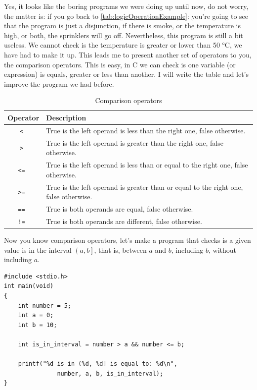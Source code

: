 \documentclass[a4paper]{article}
\newcommand{\centigrade}{°C}
\begin{document}
Yes, it looks like the boring programs we were doing up until now, do not worry,
the matter is: if you go back to \ref{tab:logicOperationExample}:
 you're going to see that the program is just
a disjunction, if there is smoke, or the temperature is high, or both, the
sprinklers will go off. Nevertheless, this program is still a bit useless. We
cannot check is the temperature is greater or lower than 50 \centigrade, we have
had to make it up. This leads me to present another set of operators to you,
the comparison operators. This is easy, in C we can check is one variable
(or expression) is equals, greater or less than another. I will write the
table and let's improve the program we had before.
\begin{table}[H]
\centering
\begin{tabularx}{\linewidth}{|c|Y|}
\hline
\bf Operator & \bf Description \\ \hline
\tt < &   True is the left operand is less than the right one, false otherwise.\\\hline
\tt > &   True is the left operand is greater than the right one, false otherwise.\\\hline
\tt <= &  True is the left operand is less than or equal to the right one, false otherwise. \\\hline
\tt >= &  True is the left operand is greater than or equal to the right one, false otherwise. \\\hline
\tt == &  True is both operands are equal, false otherwise. \\\hline
\tt != &   True is both operands are different, false otherwise. \\\hline
\end{tabularx}
\caption{Comparison operators}
\label{tab:logicOperators}
\end{table}

Now you know comparison operators, let's make a program that checks is a given
value is in the interval $\left(a, b\right]$, that is, between $a$ and $b$,
including $b$, without including $a$.

\noindent
\begin{minipage}[H]{\linewidth}
\mbox{}
\begin{lstlisting}[style=C,
caption={Primer programa con operaciones de comparación},
label={lst:firstComparingProgram}]
#include <stdio.h>
int main(void)
{
    int number = 5;
    int a = 0;
    int b = 10;

    int is_in_interval = number > a && number <= b;

    printf("%d is in (%d, %d] is equal to: %d\n",
               number, a, b, is_in_interval);
}
\end{lstlisting}
\end{minipage}
\end{document}
